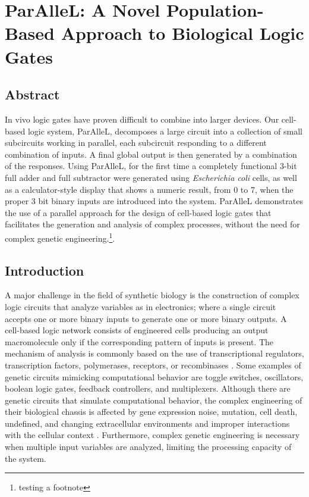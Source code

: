 \chapter{ParAlleL: A Novel Population-Based Approach to Biological Logic Gates}

\section{\textbf{Abstract }}

In vivo logic gates have proven difficult to combine into larger devices. Our cell-based logic system, ParAlleL, decomposes a large circuit into a collection of small subcircuits working in parallel, each subcircuit responding to a different combination of inputs. A final global output is then generated by a combination of the responses. Using ParAlleL, for the first time a completely functional 3-bit full adder and full subtractor were generated using \textit{Escherichia coli} cells, as well as a calculator-style display that shows a numeric result, from 0 to 7, when the proper 3 bit binary inputs are introduced into the system. ParAlleL demonstrates the use of a parallel approach for the design of cell-based logic gates that facilitates the generation and analysis of complex processes, without the need for complex genetic engineering.\footnote{testing a footnote}.

\section{\textbf{Introduction }}

A major challenge in the field of synthetic biology is the construction of complex logic circuits that analyze variables as in electronics; where a single circuit accepts one or more binary inputs to generate one or more binary outputs. A cell-based logic network consists of engineered cells producing an output macromolecule only if the corresponding pattern of inputs is present. The mechanism of analysis is commonly based on the use of transcriptional regulators, transcription factors, polymerases, receptors, or recombinases \cite{brenner2018synthetic}. Some examples of genetic circuits mimicking computational behavior are toggle switches, oscillators, boolean logic gates, feedback controllers, and multiplexers. Although there are genetic circuits that simulate computational behavior, the complex engineering of their biological chassis is affected by gene expression noise, mutation, cell death, undefined, and changing extracellular environments and improper interactions with the cellular context \cite{andrianantoandro2006synthetic}. Furthermore, complex genetic engineering is necessary when multiple input variables are analyzed, limiting the processing capacity of the system.

